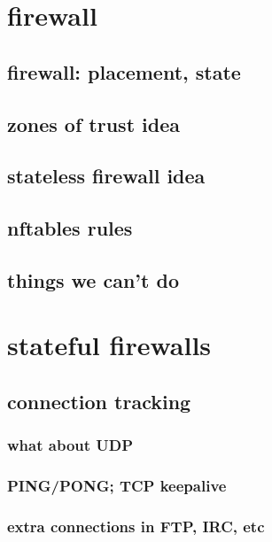 \section{firewall}



\subsection{firewall: placement, state}


\subsection{zones of trust idea}


\subsection{stateless firewall idea}


\subsection{nftables rules}


\subsection{things we can't do}


\section{stateful firewalls}

\subsection{connection tracking}

\subsubsection{what about UDP}

\subsubsection{PING/PONG; TCP keepalive}

\subsubsection{extra connections in FTP, IRC, etc}

